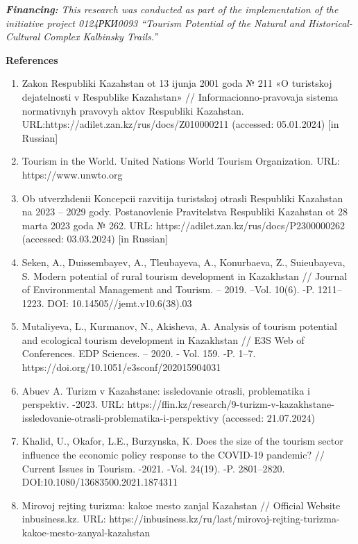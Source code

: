 \emph{{\bfseries Financing:} This research was conducted as part of the
implementation of the initiative project 0124РКИ0093 ``Tourism Potential
of the Natural and Historical-Cultural Complex
\textquotesingle Kalbinsky Trails\textquotesingle.''}

{\bfseries References}

\begin{enumerate}
\def\labelenumi{\arabic{enumi}.}
\item
  Zakon Respubliki Kazahstan ot 13 ijunja 2001 goda № 211 «O turistskoj
  dejatel\textquotesingle nosti v Respublike Kazahstan» //
  Informacionno-pravovaja sistema normativnyh pravovyh aktov Respubliki
  Kazahstan. URL:https://adilet.zan.kz/rus/docs/Z010000211 (accessed:
  05.01.2024) {[}in Russian{]}
\item
  Tourism in the World. United Nations World Tourism Organization. URL:
  https://www.unwto.org
\item
  Ob utverzhdenii Koncepcii razvitija turistskoj otrasli Respubliki
  Kazahstan na 2023 -- 2029 gody. Postanovlenie
  Pravitel\textquotesingle stva Respubliki Kazahstan ot 28 marta 2023
  goda № 262. URL: https://adilet.zan.kz/rus/docs/P2300000262 (accessed:
  03.03.2024) {[}in Russian{]}
\item
  Seken, A., Duissembayev, A., Tleubayeva, A., Konurbaeva, Z.,
  Suieubayeva, S. Modern potential of rural tourism development in
  Kazakhstan // Journal of Environmental Management and Tourism. --
  2019. --Vol. 10(6). -P. 1211--1223. DOI: 10.14505//jemt.v10.6(38).03
\item
  Mutaliyeva, L., Kurmanov, N., Akisheva, A. Analysis of tourism
  potential and ecological tourism development in Kazakhstan // E3S Web
  of Conferences. EDP Sciences. -- 2020. - Vol. 159. -P. 1--7.
  https://doi.org/10.1051/e3sconf/202015904031
\item
  Abuev A. Turizm v Kazahstane: issledovanie otrasli, problematika i
  perspektiv. -2023. URL:
  https://ffin.kz/research/9-turizm-v-kazakhstane-issledovanie-otrasli-problematika-i-perspektivy
  (accessed: 21.07.2024)
\item
  Khalid, U., Okafor, L.E., Burzynska, K. Does the size of the tourism
  sector influence the economic policy response to the COVID-19
  pandemic? // Current Issues in Tourism. -2021. -Vol. 24(19). -P.
  2801--2820. DOI:10.1080/13683500.2021.1874311
\item
  Mirovoj rejting turizma: kakoe mesto zanjal Kazahstan // Official
  Website inbusiness.kz. URL:
  https://inbusiness.kz/ru/last/mirovoj-rejting-turizma-kakoe-mesto-zanyal-kazahstan

\end{enumerate}
